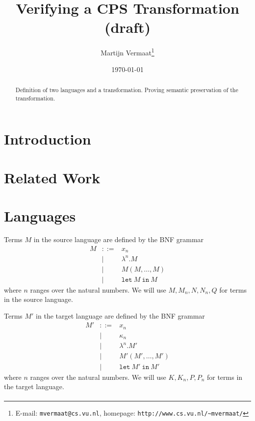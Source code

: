\documentclass[a4paper,11pt]{article}
\title{Verifying a CPS Transformation (draft)}
\author{Martijn Vermaat\footnote{E-mail: \texttt{mvermaat@cs.vu.nl},
    homepage: \texttt{http://www.cs.vu.nl/\~{}mvermaat/}}}
\date{\today}
\begin{document}
\maketitle


\begin{abstract}
  Definition of two languages and a transformation. Proving semantic preservation of the transformation.
\end{abstract}


\section{Introduction}\label{sec:introduction}


\section{Related Work}\label{sec:related}


\section{Languages}\label{sec:languages}

Terms $M$ in the source language are defined by the BNF grammar
\begin{eqnarray*}
M & ::= & x_{n} \\
  &   | & \lambda^{n}.M \\
  &   | & M(M, \ldots, M) \\
  &   | & \texttt{let} \: M \: \texttt{in} \: M
\end{eqnarray*}
where $n$ ranges over the natural numbers.
We will use $M, M_{n}, N, N_{n}, Q$ for terms in the source language.


Terms $M'$ in the target language are defined by the BNF grammar
\begin{eqnarray*}
M' & ::= & x_{n} \\
   &   | & \kappa_{n} \\
   &   | & \lambda^{n}.M' \\
   &   | & M'(M', \ldots, M') \\
   &   | & \texttt{let} \: M' \: \texttt{in} \: M'
\end{eqnarray*}
where $n$ ranges over the natural numbers.
We will use $K, K_{n}, P, P_{n}$ for terms in the target language.

\paragraph{}
\end{document}
